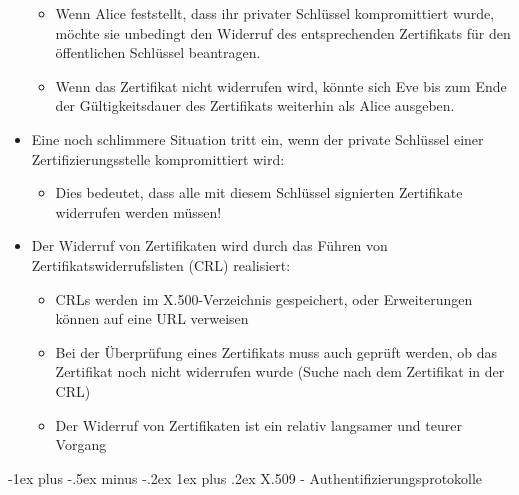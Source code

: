 \documentclass[a4paper]{article}
\makeatletter
\renewcommand{\subsubsection}{\@startsection{subsubsection}{3}{0mm}%
 {-1ex plus -.5ex minus -.2ex}%
 {1ex plus .2ex}%
 {\normalfont\small\bfseries}}
\makeatother
\begin{document}
\begin{multicols}{3}
\begin{itemize}
              \begin{itemize}
                  \item
                        Wenn Alice feststellt, dass ihr privater Schlüssel kompromittiert
                        wurde, möchte sie unbedingt den Widerruf des entsprechenden
                        Zertifikats für den öffentlichen Schlüssel beantragen.
                  \item
                        Wenn das Zertifikat nicht widerrufen wird, könnte sich Eve bis zum
                        Ende der Gültigkeitsdauer des Zertifikats weiterhin als Alice
                        ausgeben.
              \end{itemize}
        \item
              Eine noch schlimmere Situation tritt ein, wenn der private Schlüssel
              einer Zertifizierungsstelle kompromittiert wird:

              \begin{itemize}
                  \item
                        Dies bedeutet, dass alle mit diesem Schlüssel signierten Zertifikate
                        widerrufen werden müssen!
              \end{itemize}
        \item
              Der Widerruf von Zertifikaten wird durch das Führen von
              Zertifikatswiderrufslisten (CRL) realisiert:

              \begin{itemize}
                  \item
                        CRLs werden im X.500-Verzeichnis gespeichert, oder Erweiterungen
                        können auf eine URL verweisen
                  \item
                        Bei der Überprüfung eines Zertifikats muss auch geprüft werden, ob
                        das Zertifikat noch nicht widerrufen wurde (Suche nach dem
                        Zertifikat in der CRL)
                  \item
                        Der Widerruf von Zertifikaten ist ein relativ langsamer und teurer
                        Vorgang
              \end{itemize}
    \end{itemize}


    \subsubsection{X.509 -
        Authentifizierungsprotokolle}


\end{multicols}
\end{document}
